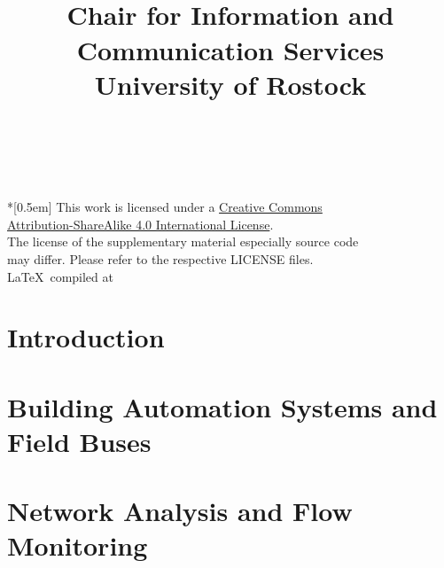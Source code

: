 \documentclass[12pt, a4paper, titlepage, oneside]{book}
\title{\thetitle\\[24pt]
	\small Chair for Information and Communication Services\\[-3pt]
	\small University of Rostock}
\author{\theauthor}
\date{\thedate}
\begin{document}
	
	~ \vfill
	\begin{flushright}
		\tiny \noindent
		{\normalsize \href{http://creativecommons.org/licenses/by-sa/4.0/}{\ccbysa}} \\*[0.5em]
		This work is licensed under a \href{http://creativecommons.org/licenses/by-sa/4.0/}{Creative Commons\\%
		Attribution-ShareAlike 4.0 International License}. \\
		The license of the supplementary material especially source code\\%
		may differ. Please refer to the respective LICENSE files.\\
		\LaTeX ~compiled at \DTMnow
	\end{flushright}
	\pagebreak
	\clearpage
	\setcounter{page}{1}
	\tableofcontents
	\listoffigures{}
	\listoftables{}
	
	\newpage
	
	\chapter{Introduction}
	\label{sec:intro}
	
	
	\chapter{Building Automation Systems and Field Buses}
	\label{sec:background:bas}
	
	
	\chapter{Network Analysis and Flow Monitoring}
	\label{sec:background:network}
	
	
\end{document}
